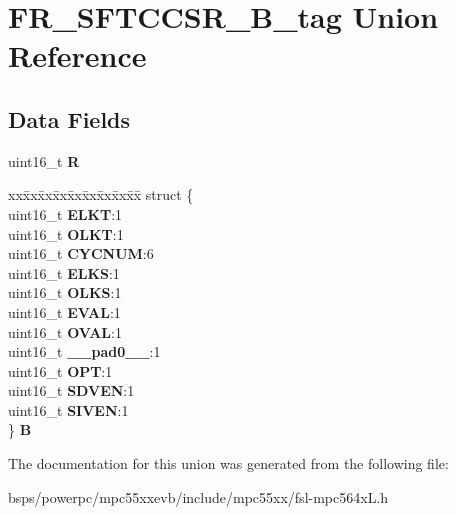 \hypertarget{unionFR__SFTCCSR__16B__tag}{}\section{F\+R\+\_\+\+S\+F\+T\+C\+C\+S\+R\+\_\+B\+\_\+tag Union Reference}
\label{unionFR__SFTCCSR__16B__tag}
\subsection*{Data Fields}
\begin{DoxyCompactItemize}
\item 
\mbox{\label{unionFR__SFTCCSR__16B__tag_a871eb9249a89e78f063f656a733f76ca}} 
uint16\+\_\+t {\bfseries R}
\item 
\mbox{\label{unionFR__SFTCCSR__16B__tag_acb1fb86504ae6296116c0ebcec58f606}} 
\begin{tabbing}
xx\=xx\=xx\=xx\=xx\=xx\=xx\=xx\=xx\=\kill
struct \{\\
\>uint16\_t {\bfseries ELKT}:1\\
\>uint16\_t {\bfseries OLKT}:1\\
\>uint16\_t {\bfseries CYCNUM}:6\\
\>uint16\_t {\bfseries ELKS}:1\\
\>uint16\_t {\bfseries OLKS}:1\\
\>uint16\_t {\bfseries EVAL}:1\\
\>uint16\_t {\bfseries OVAL}:1\\
\>uint16\_t {\bfseries \_\_pad0\_\_}:1\\
\>uint16\_t {\bfseries OPT}:1\\
\>uint16\_t {\bfseries SDVEN}:1\\
\>uint16\_t {\bfseries SIVEN}:1\\
\} {\bfseries B}\\

\end{tabbing}\end{DoxyCompactItemize}


The documentation for this union was generated from the following file\+:\begin{DoxyCompactItemize}
\item 
bsps/powerpc/mpc55xxevb/include/mpc55xx/fsl-\/mpc564x\+L.\+h\end{DoxyCompactItemize}

